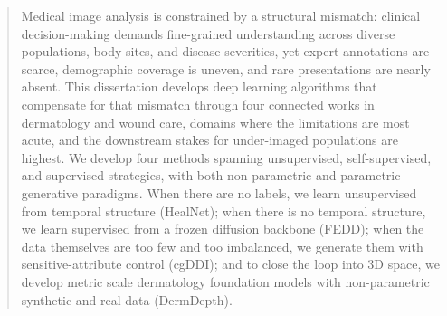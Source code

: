 \documentclass[11pt]{ucthesis}
\begin{document}
\begin{frontmatter}


\maketitle
\copyrightpage

\tableofcontents
\listoffigures
\listoftables

\begin{abstract}
Medical image analysis is constrained by a structural mismatch: clinical decision-making demands fine-grained understanding across diverse populations, body sites, and disease severities, yet expert annotations are scarce, demographic coverage is uneven, and rare presentations are nearly absent. This dissertation develops deep learning algorithms that compensate for that mismatch through four connected works in dermatology and wound care, domains where the limitations are most acute, and the downstream stakes for under-imaged populations are highest. We develop four methods spanning unsupervised, self-supervised, and supervised strategies, with both non-parametric and parametric generative paradigms. When there are no labels, we learn unsupervised from temporal structure (HealNet); when there is no temporal structure, we learn supervised from a frozen diffusion backbone (FEDD); when the data themselves are too few and too imbalanced, we generate them with sensitive-attribute control (cgDDI); and to close the loop into 3D space, we develop metric scale dermatology foundation models with non-parametric synthetic and real data (DermDepth).


\end{abstract}
\end{frontmatter}
\end{document}
